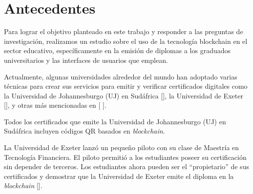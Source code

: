
\section{Antecedentes}

Para lograr el objetivo planteado en este trabajo y responder a las preguntas de investigación, realizamos un estudio sobre el uso de la tecnología blockchain en el sector educativo, específicamente en la emisión de diplomas a los graduados universitarios y las interfaces de usuarios que emplean.



Actualmente, algunas universidades alrededor del mundo han adoptado varias técnicas para crear sus servicios para emitir y verificar certificados digitales como la Universidad de Johannesburgo (UJ) en Sudáfrica [\cite{80}], la Universidad de Exeter [\cite{76}], y otras más mencionadas en [ \cite{1}]. 

Todos los certificados que emite la Universidad de Johannesburgo (UJ) en Sudáfrica incluyen códigos QR basados en \textit{blockchain}. 

La Universidad de Exeter lanzó un pequeño piloto con su clase de Maestría en Tecnología Financiera. El piloto permitió a los estudiantes poseer su certificación sin depender de terceros. Los estudiantes ahora pueden ser el ``propietario'' de sus certificados y demostrar que la Universidad de Exeter emite el diploma en la \textit{blockchain} [\cite{76}].

